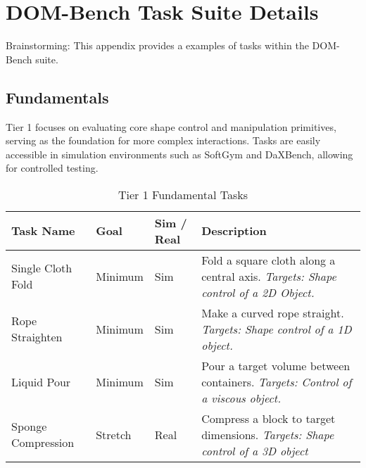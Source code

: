 \section{DOM-Bench Task Suite Details}
\label{app:task_suite} %

Brainstorming: This appendix provides a examples of tasks within the DOM-Bench suite.

\subsection{Fundamentals}
\label{app:task_suite_1}

Tier 1 focuses on evaluating core shape control and manipulation primitives, serving as the foundation for more complex interactions. Tasks are easily accessible in simulation 
environments such as SoftGym and DaXBench, allowing for controlled testing.

\begin{table}[h]
\centering
\begin{tabular}{|p{3.5cm}|p{2cm}|p{2cm}|p{7.5cm}|}
\hline
\textbf{Task Name} & \textbf{Goal} & \textbf{Sim / Real} & \textbf{Description} \\
\hline
Single Cloth Fold & Minimum & Sim & Fold a square cloth along a central axis. \textit{Targets: Shape control of a 2D Object. } \\ %
\hline
Rope Straighten & Minimum & Sim & Make a curved rope straight. \textit{Targets: Shape control of a 1D object.} \\ %
\hline 
Liquid Pour & Minimum & Sim & Pour a target volume between containers. \textit{Targets: Control of a viscous object.} \\ %
\hline
Sponge Compression & Stretch  & Real & Compress a block to target dimensions. \textit{Targets: Shape control of a 3D object} \\ %
\hline
\end{tabular}
\caption{Tier 1 Fundamental Tasks}
\end{table}

